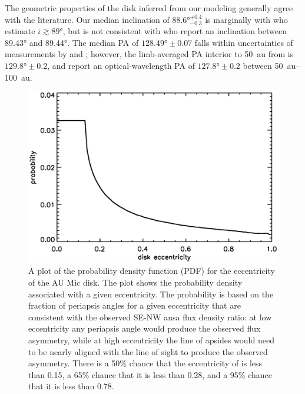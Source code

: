 \documentclass[modern]{aastex62}
\begin{document}
The geometric properties of the disk inferred from our modeling generally agree with the literature. 
Our median inclination of $\ang[angle-symbol-over-decimal]{88.6}^{+0.4}_{-0.3}$ is marginally with \cite{metchev05} who estimate $i \gtrsim \ang[angle-symbol-over-decimal]{89}$, but is not consistent with \cite{krist05} who report an inclination between \ang[angle-symbol-over-decimal]{89.43} and \ang[angle-symbol-over-decimal]{89.44}.
The median PA of $\ang[angle-symbol-over-decimal]{128.49} \pm 0.07$ falls within uncertainties of measurements by \citet{macgregor13} and \citet{krist05}; however, the limb-averaged PA interior to \SI{50}{au} from \citet{metchev05} is $\ang[angle-symbol-over-decimal]{129.8} \pm 0.2$, and \citet{schneider14} report an optical-wavelength PA of $\ang[angle-symbol-over-decimal]{127.8} \pm 0.2$ between \SIrange{50}{100}{au}.

\begin{figure}
  \centering
  \includegraphics[width=\linewidth]{../figures/eccdiffprobplot.eps}
  \caption{
    A plot of the probability density function (PDF) for the eccentricity of the AU Mic disk.
    The plot shows the probability density associated with a given eccentricity.
    The probability is based on the fraction of periapsis angles for a given eccentricity that are consistent with the observed SE-NW ansa flux density ratio: at low eccentricity any periapsis angle would produce the observed flux asymmetry, while at high eccentricity the line of apsides would need to be nearly aligned with the line of sight to produce the observed asymmetry.
    There is a 50\% chance that the eccentricity of is less than 0.15, a 65\% chance that it is less than 0.28, and a 95\% chance that it is less than 0.78.
  }
  \label{fig: eccentricity}
\end{figure}
\end{document}
